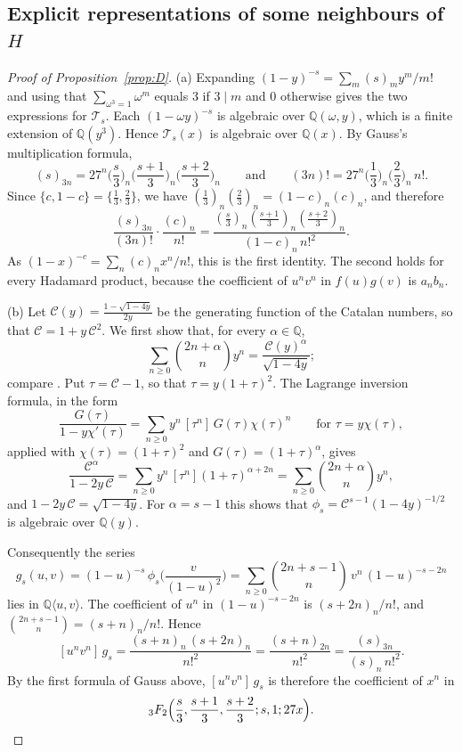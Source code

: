 \documentclass[11pt]{amsart}
\theoremstyle{definition}
\theoremstyle{remark}
\numberwithin{equation}{section}
\newcommand{\Q}{\mathbb{Q}}
\newcommand{\cT}{\mathcal{T}}
\newcommand{\alg}[2]{#1\langle #2\rangle}
\begin{document}
\subsection{Explicit representations of some neighbours of $H$}\label{subsec:proofD}
\begin{proof}[Proof of Proposition~\ref{prop:D}]
(a) Expanding $(1-y)^{-s}=\sum_m(s)_my^m/m!$ and using that $\sum_{\omega^3=1}\omega^m$ equals $3$ if $3\mid m$ and $0$ otherwise gives the two expressions for $\cT_s$. Each $(1-\omega y)^{-s}$ is algebraic over $\Q(\omega,y)$, which is a finite extension of $\Q(y^3)$. Hence $\cT_s(x)$ is algebraic over $\Q(x)$. By Gauss's multiplication formula,
\[
(s)_{3n}=27^n\Big(\frac s3\Big)_n\Big(\frac{s+1}3\Big)_n\Big(\frac{s+2}3\Big)_n\qquad\text{and}\qquad(3n)!=27^n\Big(\frac13\Big)_n\Big(\frac23\Big)_n\,n!.
\]
Since $\{c,1-c\}=\{\frac13,\frac23\}$, we have $(\frac13)_n(\frac23)_n=(1-c)_n(c)_n$, and therefore
\[
\frac{(s)_{3n}}{(3n)!}\cdot\frac{(c)_n}{n!}=\frac{(\frac s3)_n(\frac{s+1}3)_n(\frac{s+2}3)_n}{(1-c)_n\,n!^2}.
\]
As $(1-x)^{-c}=\sum_n(c)_nx^n/n!$, this is the first identity. The second holds for every Hadamard product, because the coefficient of $u^nv^n$ in $f(u)g(v)$ is $a_nb_n$.

(b) Let $\mathcal C(y)=\frac{1-\sqrt{1-4y}}{2y}$ be the generating function of the Catalan numbers, so that $\mathcal C=1+y\,\mathcal C^2$. We first show that, for every $\alpha\in\Q$,
\begin{equation}\label{eq:catalan}
\sum_{n\ge0}\binom{2n+\alpha}{n}y^n=\frac{\mathcal C(y)^\alpha}{\sqrt{1-4y}} ;
\end{equation}
compare \citet[\S5.4]{GrahamKnuthPatashnik1994}. Put $\tau=\mathcal C-1$, so that $\tau=y(1+\tau)^2$. The Lagrange inversion formula, in the form
\[
\frac{G(\tau)}{1-y\chi'(\tau)}=\sum_{n\ge0}y^n\,[\tau^n]\,G(\tau)\chi(\tau)^n\qquad\text{for }\tau=y\chi(\tau),
\]
applied with $\chi(\tau)=(1+\tau)^2$ and $G(\tau)=(1+\tau)^\alpha$, gives
\[
\frac{\mathcal C^\alpha}{1-2y\,\mathcal C}=\sum_{n\ge0}y^n\,[\tau^n](1+\tau)^{\alpha+2n}=\sum_{n\ge0}\binom{2n+\alpha}{n}y^n ,
\]
and $1-2y\,\mathcal C=\sqrt{1-4y}$. For $\alpha=s-1$ this shows that $\phi_s=\mathcal C^{s-1}(1-4y)^{-1/2}$ is algebraic over $\Q(y)$.

Consequently the series
\[
g_s(u,v)=(1-u)^{-s}\,\phi_s\Big(\frac v{(1-u)^2}\Big)=\sum_{n\ge0}\binom{2n+s-1}n\,v^n\,(1-u)^{-s-2n}
\]
lies in $\alg\Q{u,v}$. The coefficient of $u^n$ in $(1-u)^{-s-2n}$ is $(s+2n)_n/n!$, and $\binom{2n+s-1}n=(s+n)_n/n!$. Hence
\[
[u^nv^n]\,g_s=\frac{(s+n)_n\,(s+2n)_n}{n!^2}=\frac{(s+n)_{2n}}{n!^2}=\frac{(s)_{3n}}{(s)_n\,n!^2}.
\]
By the first formula of Gauss above, $[u^nv^n]\,g_s$ is therefore the coefficient of $x^n$ in
\[
{}_3F_2\Big(\frac s3,\frac{s+1}3,\frac{s+2}3;s,1;27x\Big).\qedhere
\]
\end{proof}
\end{document}
